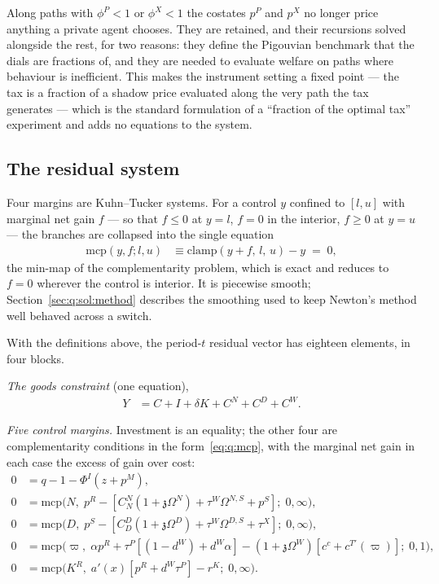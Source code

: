 Along paths with $\phi^P<1$ or $\phi^X<1$ the costates $p^P$ and $p^X$ no longer price anything a private agent chooses. They are retained, and their recursions solved alongside the rest, for two reasons: they define the Pigouvian benchmark that the dials are fractions of, and they are needed to evaluate welfare on paths where behaviour is inefficient. This makes the instrument setting a fixed point --- the tax is a fraction of a shadow price evaluated along the very path the tax generates --- which is the standard formulation of a ``fraction of the optimal tax'' experiment and adds no equations to the system.

\subsection{The residual system}\label{sec:q:model:residuals}

 Four margins are Kuhn--Tucker systems. For a control $y$ confined to $\left[l,u\right]$ with marginal net gain $f$ --- so that $f\le0$ at $y=l$, $f=0$ in the interior, $f\ge0$ at $y=u$ --- the branches are collapsed into the single equation
\begin{align}
\mathrm{mcp}\left(y,f;l,u\right) &\equiv \mathrm{clamp}\left(y+f,\,l,\,u\right)-y \;=\;0 ,
\label{eq:q:mcp}
\end{align}
the min-map of the complementarity problem, which is exact and reduces to $f=0$ wherever the control is interior. It is piecewise smooth; Section~\ref{sec:q:sol:method} describes the smoothing used to keep Newton's method well behaved across a switch.

 With the definitions above, the period-$t$ residual vector has eighteen elements, in four blocks.

\emph{The goods constraint} (one equation),
\begin{align}
Y &= C+I+\delta K+C^N+C^D+C^W .
\label{eq:q:goods}
\end{align}

\emph{Five control margins.} Investment is an equality; the other four are complementarity conditions in the form~\eqref{eq:q:mcp}, with the marginal net gain in each case the excess of gain over cost:
\begin{align}
0 &= q-1-\Phi^I\left(z+p^M\right),
\label{eq:q:focI}
\\
0 &= \mathrm{mcp}\Big(N,\; p^R-\left[C^N_N\left(1+\mathfrak z\Omega^N\right)+\tau^W\Omega^{N,S}+p^S\right];\;0,\infty\Big),
\label{eq:q:focN}
\\
0 &= \mathrm{mcp}\Big(D,\; p^S-\left[C^D_D\left(1+\mathfrak z\Omega^D\right)+\tau^W\Omega^{D,S}+\tau^X\right];\;0,\infty\Big),
\label{eq:q:focD}
\\
0 &= \mathrm{mcp}\Big(\varpi,\; \alpha p^R+\tau^P\left[\left(1-d^W\right)+d^W\alpha\right]-\left(1+\mathfrak z\Omega^W\right)\left[c^c+c^{T\prime}\left(\varpi\right)\right];\;0,1\Big),
\label{eq:q:focvarpi}
\\
0 &= \mathrm{mcp}\Big(K^R,\; a'\!\left(x\right)\left[p^R+d^W\tau^P\right]-r^K;\;0,\infty\Big).
\label{eq:q:focKR}
\end{align}

